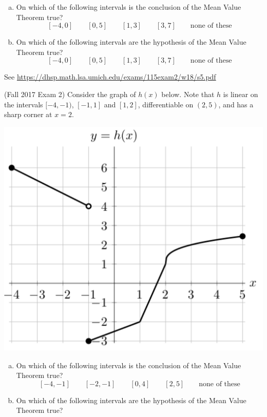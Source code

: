 \documentclass[11pt]{exam}
\begin{document}
\begin{questions}
\begin{enumerate}[(a)]
	\item On which of the following intervals is the conclusion of the Mean Value Theorem true?
	$$[-4,0] \qquad [0,5] \qquad [1,3] \qquad [3,7] \qquad \textrm{none of these}$$
	\item On which of the following intervals are the hypothesis of the Mean Value Theorem true?
	$$[-4,0] \qquad [0,5] \qquad [1,3] \qquad [3,7] \qquad \textrm{none of these}$$
\end{enumerate}
\begin{solution}
  See \href{https://dhsp.math.lsa.umich.edu/exams/115exam2/w18/s5.pdf}{https://dhsp.math.lsa.umich.edu/exams/115exam2/w18/s5.pdf}
\end{solution}
\question (Fall 2017 Exam 2) Consider the graph of $h(x)$ below. Note that \(h\) is linear on the intervals $[-4,-1)$, $[-1,1]$ and $[1,2]$, differentiable on $(2, 5)$, and has a sharp corner at $x = 2$.
\begin{center}
  \includegraphics[scale=0.4]{Figures/Exam2Fall2017Problem4}
\end{center}
\begin{enumerate}[(a)]
	\item On which of the following intervals is the conclusion of the Mean Value Theorem true?
	$$[-4,-1] \qquad [-2,-1] \qquad [0,4] \qquad [2,5] \qquad \textrm{none of these}$$
	\item On which of the following intervals are the hypothesis of the Mean Value Theorem true?

\end{enumerate}
\end{questions}
\end{document}
